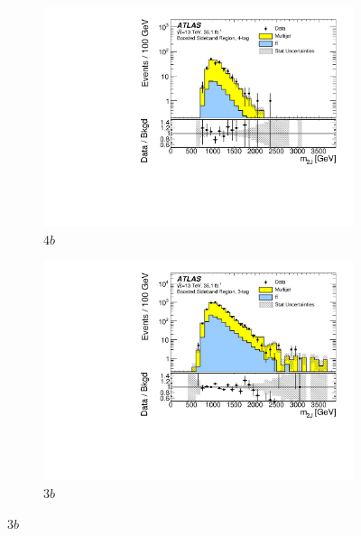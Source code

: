 \begin{figure}[htbp!]
  \centering
  \captionsetup{justification=centering}
    \hspace{-2cm}
    \begin{subfigure}[b]{0.35\textwidth}
        \includegraphics[width=\textwidth,angle=-90]{figures/boosted/Paperplot/Moriond_bkg_9_FourTag_Sideband_mHH_l_1.pdf}
        \caption{$4b$}
        \label{fig:boosted-sb-mjj-4b}
    \end{subfigure}
    \quad \quad \quad \quad \quad
    \begin{subfigure}[b]{0.35\textwidth}
        \includegraphics[width=\textwidth,angle=-90]{figures/boosted/Paperplot/Moriond_bkg_9_ThreeTag_Sideband_mHH_l_1.pdf}
        \caption{$3b$}
        \label{fig:boosted-sb-mjj-3b}
    \end{subfigure}

\end{figure}
